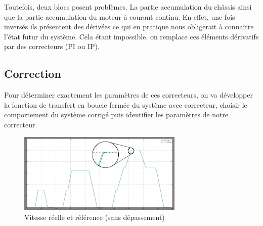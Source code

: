 Toutefois, deux blocs posent problèmes. La partie accumulation du châssis ainsi que la partie accumulation du moteur à courant continu. En effet, une fois inversés ils présentent des dérivées ce qui en pratique nous obligerait à connaître l'état futur du système. Cela étant impossible, on remplace ces éléments dérivatifs par des correcteurs (PI ou IP).\\

\subsection{Correction}
Pour déterminer exactement les paramètres de ces correcteurs, on va développer la fonction de transfert en boucle fermée du système avec correcteur, choisir le comportement du système corrigé puis identifier les paramètres de notre correcteur.\\



\begin{figure}[ht]
\begin{center}
	\includegraphics[width=0.7\textwidth]{images/vitesse_zoom}
	\caption{Vitesse réelle et référence (sans dépassement)}\label{img:vitesse} 
\end{center}
\end{figure}